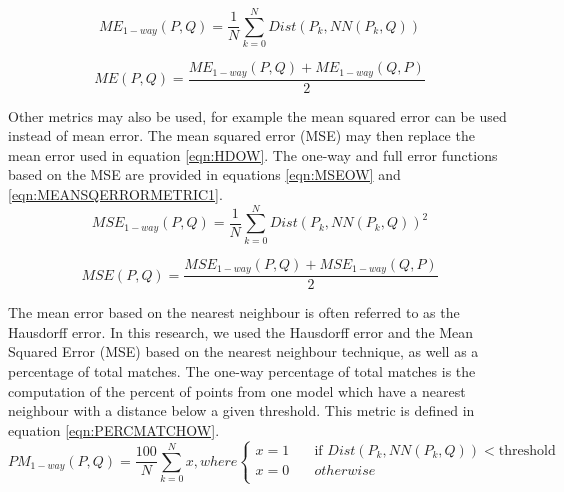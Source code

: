 \begin{equation} \label{eqn:HDOW}
ME_{1-way}(P, Q) = \frac{1}{N}\sum_{k=0}^{N} Dist(P_k, NN(P_k, Q))
\end{equation}


\begin{equation} \label{eqn:MEANERRORMETRIC1}
ME(P, Q) = \frac{ME_{1-way}(P,Q) + ME_{1-way}(Q,P)}{2}
\end{equation}

Other metrics may also be used, for example the mean squared error can be used instead of mean error. The mean squared error (MSE) may then replace the mean error used in equation \ref{eqn:HDOW}. The one-way and full error functions based on the MSE are provided in equations \ref{eqn:MSEOW} and \ref{eqn:MEANSQERRORMETRIC1}. \\


\begin{equation} \label{eqn:MSEOW}
MSE_{1-way}(P, Q) = \frac{1}{N}\sum_{k=0}^{N} Dist(P_k, NN(P_k, Q))^2
\end{equation}


\begin{equation} \label{eqn:MEANSQERRORMETRIC1}
MSE(P,Q) = \frac{MSE_{1-way}(P,Q) + MSE_{1-way}(Q,P)}{2}
\end{equation}


The mean error based on the nearest neighbour is often referred to as the Hausdorff error. In this research, we used the Hausdorff error and the Mean Squared Error (MSE) based on the nearest neighbour technique, as well as a percentage of total matches. The one-way percentage of total matches is the computation of the percent of points from one model which have a nearest neighbour with a distance below a given threshold. This metric is defined in equation \ref{eqn:PERCMATCHOW}. \\

\begin{equation} \label{eqn:PERCMATCHOW}
PM_{1-way}(P, Q) = \frac{100}{N}\sum_{k=0}^{N} x, where
  \begin{cases}
    x=1       & \quad \text{if } Dist(P_k,NN(P_k,Q)) < \text{threshold}\\
    x=0  & \quad otherwise\\
  \end{cases}
\end{equation}


